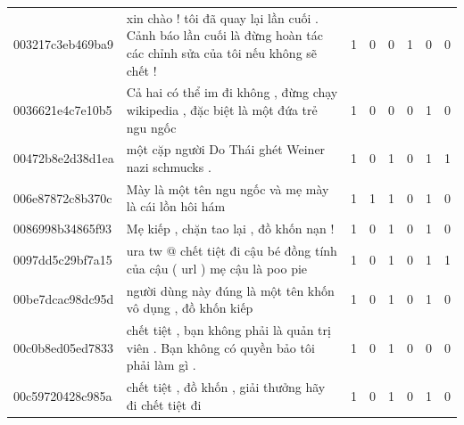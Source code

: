 \begin{table}[htb]
{\begin{minipage}{\textheight}
\begin{threeparttable}
\begin{tabularx}{\textwidth}{L{0.8} L{6.6} C{0.1} C{0.1} C{0.1} C{0.1} C{0.1} C{0.1}}
                    003217c3eb469ba9 & xin chào ! tôi đã quay lại lần cuối . Cảnh báo lần cuối là đừng hoàn tác các chỉnh sửa của tôi nếu không sẽ chết !                & 1           & 0           & 0           & 1           & 0           & 0           \\
                    0036621e4c7e10b5 & Cả hai có thể im đi không , đừng chạy wikipedia , đặc biệt là một đứa trẻ ngu ngốc                                                & 1           & 0           & 0           & 0           & 1           & 0           \\
                    00472b8e2d38d1ea & một cặp người Do Thái ghét Weiner nazi schmucks .                                                                                 & 1           & 0           & 1           & 0           & 1           & 1           \\
                    006e87872c8b370c & Mày là một tên ngu ngốc và mẹ mày là cái lồn hôi hám                                                                              & 1           & 1           & 1           & 0           & 1           & 0           \\
                    0086998b34865f93 & Mẹ kiếp , chặn tao lại , đồ khốn nạn !                                                                                            & 1           & 0           & 1           & 0           & 1           & 0           \\
                    0097dd5c29bf7a15 & ura tw @ chết tiệt đi cậu bé đồng tính của cậu ( url ) mẹ cậu là poo pie                                                          & 1           & 0           & 1           & 0           & 1           & 1           \\
                    00be7dcac98dc95d & người dùng này đúng là một tên khốn vô dụng , đồ khốn kiếp                                                                        & 1           & 0           & 1           & 0           & 1           & 0           \\
                    00c0b8ed05ed7833 & chết tiệt , bạn không phải là quản trị viên . Bạn không có quyền bảo tôi phải làm gì .                                            & 1           & 0           & 1           & 0           & 0           & 0           \\
                    00c59720428c985a & chết tiệt , đồ khốn , giải thưởng hãy đi chết tiệt đi                                                                             & 1           & 0           & 1           & 0           & 1           & 0           \\

\end{tabularx}
\end{threeparttable}
\end{minipage}}
\end{table}

